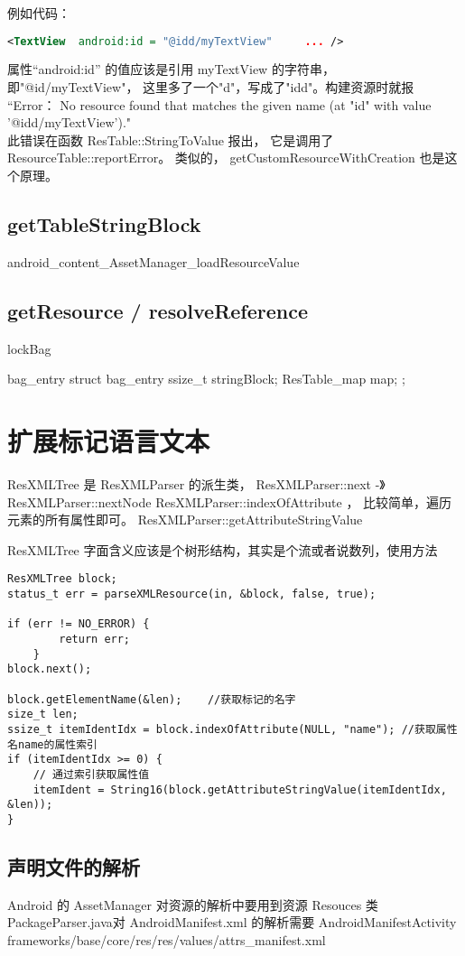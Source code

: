\documentclass[a4paper,11pt]{article}
\begin{document}
例如代码： 
\begin{lstlisting}[language=xml]
<TextView  android:id = "@idd/myTextView"     ... /> 
\end{lstlisting}

属性“android:id” 的值应该是引用 myTextView 的字符串，即"@id/myTextView"，
这里多了一个"d"，写成了"idd"。构建资源时就报
\\\indent“Error： No resource found that matches the given name (at 
"id" with value '@idd/myTextView')." 
\\\indent 此错误在函数 ResTable::StringToValue 报出，
它是调用了ResourceTable::reportError。 
类似的， getCustomResourceWithCreation 也是这个原理。


\subsection{getTableStringBlock}
android_content_AssetManager_loadResourceValue
\subsection{getResource / resolveReference}

lockBag

bag_entry 
    struct bag_entry {
        ssize_t stringBlock;
        ResTable_map map;
    };


\section{扩展标记语言文本}
ResXMLTree 是 ResXMLParser 的派生类，
ResXMLParser::next    -》 ResXMLParser::nextNode
ResXMLParser::indexOfAttribute ， 比较简单，遍历元素的所有属性即可。
ResXMLParser::getAttributeStringValue

ResXMLTree 字面含义应该是个树形结构，其实是个流或者说数列，使用方法
\begin{lstlisting}
ResXMLTree block;
status_t err = parseXMLResource(in, &block, false, true);

if (err != NO_ERROR) {
        return err;
    }
block.next();

block.getElementName(&len);    //获取标记的名字
size_t len;
ssize_t itemIdentIdx = block.indexOfAttribute(NULL, "name"); //获取属性名name的属性索引
if (itemIdentIdx >= 0) {
    // 通过索引获取属性值
    itemIdent = String16(block.getAttributeStringValue(itemIdentIdx, &len));
} 
\end{lstlisting}

\subsection{声明文件的解析}
Android 的 AssetManager 对资源的解析中要用到资源 Resouces 类
PackageParser.java对 AndroidManifest.xml 的解析需要 AndroidManifestActivity
frameworks/base/core/res/res/values/attrs_manifest.xml
\end{document}

